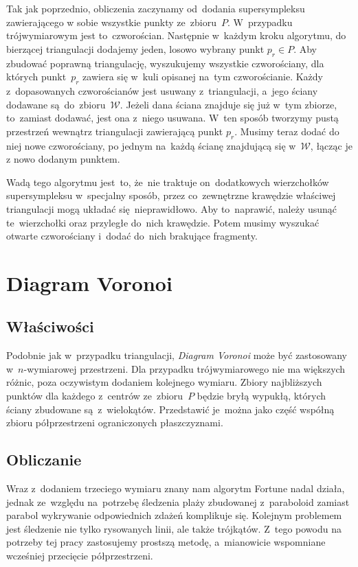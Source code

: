 \documentclass[skorowidz,autorrok,backref,xodstep,oswiadczenie]{wmimgr}
\begin{document}
Tak jak poprzednio, obliczenia zaczynamy od~dodania supersympleksu zawierającego w sobie wszystkie punkty ze~zbioru~$P$. W~przypadku trójwymiarowym jest to~czworościan. Następnie w~każdym kroku algorytmu, do bierzącej triangulacji dodajemy jeden, losowo wybrany punkt $p_{r} \in P$. Aby zbudować poprawną triangulację, wyszukujemy wszystkie czworościany, dla których punkt~$p_{r}$ zawiera się w~kuli opisanej na~tym czworościanie. Każdy z~dopasowanych czworościanów jest usuwany z~triangulacji, a~jego ściany dodawane są~do~zbioru~$\mathcal{W}$. Jeżeli dana ściana znajduje się już w~tym zbiorze, to~zamiast dodawać, jest ona z~niego usuwana. W~ten sposób tworzymy pustą przestrzeń wewnątrz triangulacji zawierającą punkt $p_{r}$. Musimy teraz dodać do niej nowe czworościany, po jednym na~każdą ścianę znajdującą się w~$\mathcal{W}$, łącząc je z nowo dodanym punktem.

Wadą tego algorytmu jest~to, że~nie traktuje on~dodatkowych wierzchołków supersympleksu w~specjalny sposób, przez co~zewnętrzne krawędzie właściwej triangulacji mogą układać się~nieprawidłowo. Aby to~naprawić, należy usunąć te~wierzchołki oraz przyległe do~nich krawędzie. Potem musimy wyszukać otwarte czworościany i~dodać do~nich brakujące fragmenty.

\section{Diagram Voronoi}

\subsection{Właściwości}

Podobnie jak w~przypadku triangulacji, \emph{Diagram Voronoi} może być zastosowany w~$n$-wymiarowej przestrzeni. Dla przypadku trójwymiarowego nie ma większych różnic, poza oczywistym dodaniem kolejnego wymiaru. Zbiory najbliższych punktów dla każdego z~centrów ze~zbioru~$P$ będzie bryłą wypukłą, których ściany zbudowane są~z~wielokątów. Przedstawić je~można jako część współną zbioru półprzestrzeni ograniczonych płaszczyznami.

\subsection{Obliczanie}

Wraz z~dodaniem trzeciego wymiaru znany nam algorytm Fortune nadal działa, jednak ze~względu na~potrzebę śledzenia plaży zbudowanej z~paraboloid zamiast parabol wykrywanie odpowiednich zdażeń komplikuje się. Kolejnym problemem jest śledzenie nie tylko rysowanych linii, ale także trójkątów. Z~tego powodu na potrzeby tej pracy zastosujemy prostszą metodę, a~mianowicie wspomniane wcześniej przecięcie półprzestrzeni.
\end{document}
